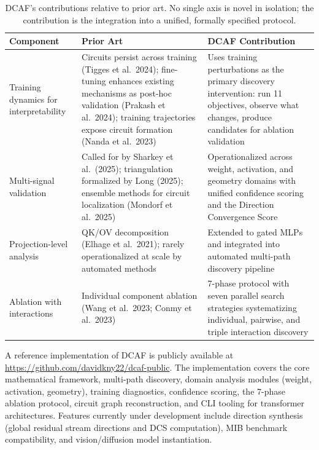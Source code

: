 \documentclass[11pt]{article}
\begin{document}
\begin{table}[h]
\centering
\small
\begin{tabular}{p{}p{}p{}}
\toprule
\textbf{Component} & \textbf{Prior Art} & \textbf{DCAF Contribution} \\
\midrule
Training dynamics for interpretability & Circuits persist across training (Tigges et al.\ 2024); fine-tuning enhances existing mechanisms as post-hoc validation (Prakash et al.\ 2024); training trajectories expose circuit formation (Nanda et al.\ 2023) & Uses training perturbations as the primary discovery intervention: run 11 objectives, observe what changes, produce candidates for ablation validation \\
Multi-signal validation & Called for by Sharkey et al.\ (2025); triangulation formalized by Long (2025); ensemble methods for circuit localization (Mondorf et al.\ 2025) & Operationalized across weight, activation, and geometry domains with unified confidence scoring and the Direction Convergence Score \\
Projection-level analysis & QK/OV decomposition (Elhage et al.\ 2021); rarely operationalized at scale by automated methods & Extended to gated MLPs and integrated into automated multi-path discovery pipeline \\
Ablation with interactions & Individual component ablation (Wang et al.\ 2023; Conmy et al.\ 2023) & 7-phase protocol with seven parallel search strategies systematizing individual, pairwise, and triple interaction discovery \\
\bottomrule
\end{tabular}
\caption{DCAF's contributions relative to prior art. No single axis is novel in isolation; the contribution is the integration into a unified, formally specified protocol.}
\label{tab:novelty}
\end{table}

A reference implementation of DCAF is publicly available at \url{https://github.com/davidkny22/dcaf-public}. The implementation covers the core mathematical framework, multi-path discovery, domain analysis modules (weight, activation, geometry), training diagnostics, confidence scoring, the 7-phase ablation protocol, circuit graph reconstruction, and CLI tooling for transformer architectures. Features currently under development include direction synthesis (global residual stream directions and DCS computation), MIB benchmark compatibility, and vision/diffusion model instantiation.
\end{document}
